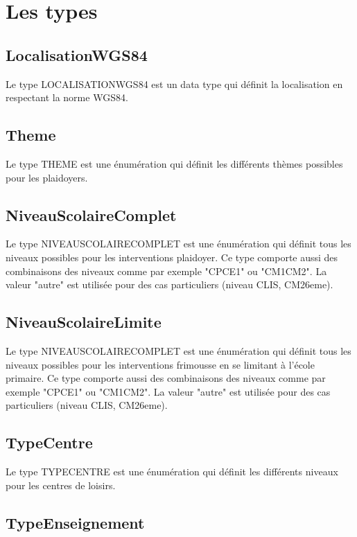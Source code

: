 \documentclass[asi, sansVersion]{picInsa}
\begin{document}
\section{Les types}

\subsection*{LocalisationWGS84}

Le type LOCALISATIONWGS84 est un data type qui définit la localisation en respectant la norme WGS84.

\subsection*{Theme}

Le type THEME est une énumération qui définit les différents thèmes possibles pour les plaidoyers.

\subsection*{NiveauScolaireComplet}

Le type NIVEAUSCOLAIRECOMPLET est une énumération qui définit tous les niveaux possibles pour les interventions plaidoyer. Ce type comporte aussi des combinaisons des niveaux comme par exemple "CPCE1" ou "CM1CM2". La valeur "autre" est utilisée pour des cas particuliers (niveau CLIS, CM26eme).

\subsection*{NiveauScolaireLimite}

Le type NIVEAUSCOLAIRECOMPLET est une énumération qui définit tous les niveaux possibles pour les interventions frimousse en se limitant à l'école primaire. Ce type comporte aussi des combinaisons des niveaux comme par exemple "CPCE1" ou "CM1CM2". La valeur "autre" est utilisée pour des cas particuliers (niveau CLIS, CM26eme).

\subsection*{TypeCentre}

Le type TYPECENTRE est une énumération qui définit les différents niveaux pour les centres de loisirs.

\subsection*{TypeEnseignement}
\end{document}
